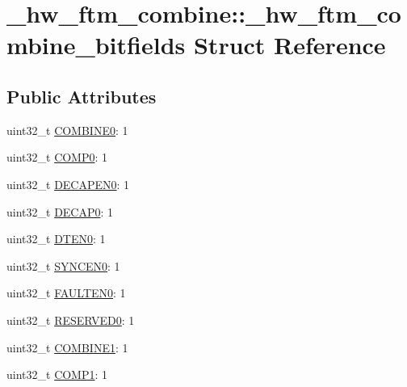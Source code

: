 \hypertarget{struct__hw__ftm__combine_1_1__hw__ftm__combine__bitfields}{}\section{\+\_\+hw\+\_\+ftm\+\_\+combine\+:\+:\+\_\+hw\+\_\+ftm\+\_\+combine\+\_\+bitfields Struct Reference}
\label{struct__hw__ftm__combine_1_1__hw__ftm__combine__bitfields}
\subsection*{Public Attributes}
\begin{DoxyCompactItemize}
\item 
uint32\+\_\+t \hyperlink{struct__hw__ftm__combine_1_1__hw__ftm__combine__bitfields_a471184224c648c65209468fd3bc9fa43}{C\+O\+M\+B\+I\+N\+E0}\+: 1
\item 
uint32\+\_\+t \hyperlink{struct__hw__ftm__combine_1_1__hw__ftm__combine__bitfields_aa3f1745f6eed679f1661d4d86abaf72b}{C\+O\+M\+P0}\+: 1
\item 
uint32\+\_\+t \hyperlink{struct__hw__ftm__combine_1_1__hw__ftm__combine__bitfields_a27220403e7a200b1b23d6b274afd6862}{D\+E\+C\+A\+P\+E\+N0}\+: 1
\item 
uint32\+\_\+t \hyperlink{struct__hw__ftm__combine_1_1__hw__ftm__combine__bitfields_ab68570eb72f026c9a5d24d230233addb}{D\+E\+C\+A\+P0}\+: 1
\item 
uint32\+\_\+t \hyperlink{struct__hw__ftm__combine_1_1__hw__ftm__combine__bitfields_a64fcb56a282edb936d478fbc89b2ff8d}{D\+T\+E\+N0}\+: 1
\item 
uint32\+\_\+t \hyperlink{struct__hw__ftm__combine_1_1__hw__ftm__combine__bitfields_a89f5e2e24873b3c8bea8c234fa582bbb}{S\+Y\+N\+C\+E\+N0}\+: 1
\item 
uint32\+\_\+t \hyperlink{struct__hw__ftm__combine_1_1__hw__ftm__combine__bitfields_a6cc9468dbfb7c56dcd22fb9ebacd65db}{F\+A\+U\+L\+T\+E\+N0}\+: 1
\item 
uint32\+\_\+t \hyperlink{struct__hw__ftm__combine_1_1__hw__ftm__combine__bitfields_af548c9473b1ae59edddc38f33995366f}{R\+E\+S\+E\+R\+V\+E\+D0}\+: 1
\item 
uint32\+\_\+t \hyperlink{struct__hw__ftm__combine_1_1__hw__ftm__combine__bitfields_a375c01447d6b4cad1b7139db8f5e885e}{C\+O\+M\+B\+I\+N\+E1}\+: 1
\item 
uint32\+\_\+t \hyperlink{struct__hw__ftm__combine_1_1__hw__ftm__combine__bitfields_a8094b3f5fd518b416034c4c71a4458eb}{C\+O\+M\+P1}\+: 1

\end{DoxyCompactItemize}

